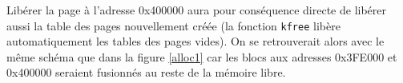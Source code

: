 Libérer la page à l'adresse 0x400000 aura pour conséquence directe de libérer aussi
la table des pages nouvellement créée (la fonction \texttt{kfree} libère
automatiquement les tables des pages vides). On se retrouverait alors avec le même
schéma que dans la figure \ref{alloc1} car les blocs aux adresses 0x3FE000 et
0x400000 seraient fusionnés au reste de la mémoire libre.